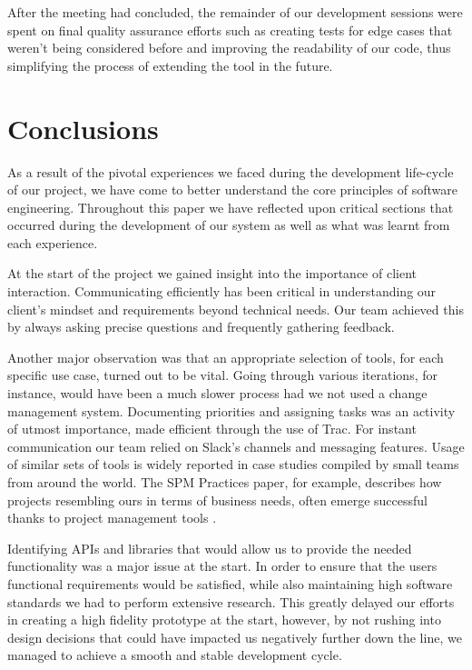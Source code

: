 \documentclass{l3proj}
\begin{document}
After the meeting had concluded, the remainder of our development sessions were spent on final quality assurance efforts such as creating tests for edge cases that weren't being considered before and improving the readability of our code, thus simplifying the process of extending the tool in the future.

\newpage
\section{Conclusions}
\label{sec:conclusion}
As a result of the pivotal experiences we faced during the development life-cycle of our project, we have come to better understand the core principles of software engineering. Throughout this paper we have reflected upon critical sections that occurred during the development of our system as well as what was learnt from each experience.

At the start of the project we gained insight into the importance of client interaction. Communicating efficiently has been critical in understanding our client's mindset and requirements beyond technical needs. Our team achieved this by always asking precise questions and frequently gathering feedback.

Another major observation was that an appropriate selection of tools, for each specific use case, turned out to be vital. Going through various iterations, for instance, would have been a much slower process had we not used a change management system. Documenting priorities and assigning tasks was an activity of utmost importance, made efficient through the use of Trac. For instant communication our team relied on Slack's channels and messaging features. Usage of similar sets of tools is widely reported in case studies compiled by small teams from around the world. The SPM Practices paper, for example, describes how projects resembling ours in terms of business needs, often emerge successful thanks to project management tools \cite{Software-Management}.

Identifying APIs and libraries that would allow us to provide the needed functionality was a major issue at the start. In order to ensure that the users functional requirements would be satisfied, while also maintaining high software standards we had to perform extensive research. This greatly delayed our efforts in creating a high fidelity prototype at the start, however, by not rushing into design decisions that could have impacted us negatively further down the line, we managed to achieve a smooth and stable development cycle.
\end{document}
